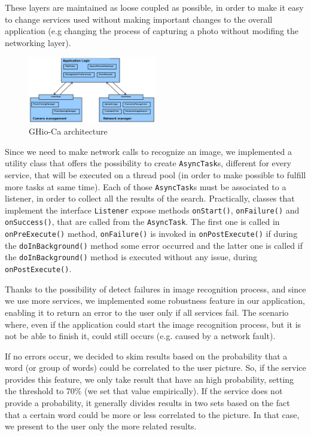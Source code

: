 These layers are maintained as loose coupled as possible, in order to make it
easy to change services used without making important changes to the overall
application (e.g changing the process of capturing a photo without modifing the
networking layer).

\begin{figure}[h]
    \centering
    \includegraphics[width=0.50\textwidth]{../img/ghioca_macro_component}
    \caption{GHio-Ca architecture}
    \label{fig:architecture}
\end{figure}

Since we need to make network calls to recognize an image, we implemented a
utility class that offers the possibility to create \texttt{AsyncTask}s,
different for every service, that will be executed on a thread pool (in order to
make possible to fulfill more tasks at same time). Each of those
\texttt{AsyncTask}s must be associated to a listener, in order to collect all
the results of the search. Practically, classes that implement the interface
\texttt{Listener} expose methods \texttt{onStart()}, \texttt{onFailure()} and
\texttt{onSuccess()}, that are called from the \texttt{AsyncTask}. The first one
is called in \texttt{onPreExecute()} method, \texttt{onFailure()} is invoked in
\texttt{onPostExecute()} if during the \texttt{doInBackground()} method some
error occurred and the latter one is called if the \texttt{doInBackground()}
method is executed without any issue, during \texttt{onPostExecute()}.

Thanks to the possibility of detect failures in image recognition process, and since
we use more services, we implemented some robustness feature in our application,
enabling it to return an error to the user only if all services fail. The
scenario where, even if the application could start the image recognition
process, but it is not be able to finish it, could still occurs (e.g. caused
by a network fault).

If no errors occur, we decided to skim results based on the probability that a
word (or group of words) could be correlated to the user picture. So, if the
service provides this feature, we only take result that have an high
probability, setting the threshold to 70\% (we set that value empirically). If the
service does not provide a probability, it generally divides results in two sets
based on the fact that a
certain word could be more or less correlated to the picture. In that case, we
present to the user only the more related results.

